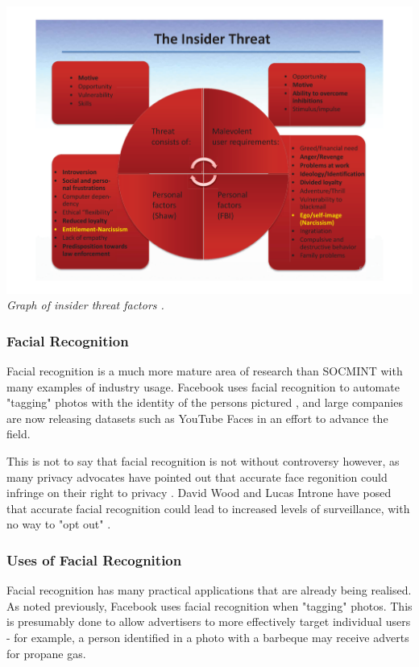 \documentclass[12pt]{article}
\begin{document}
\begin{center}
\includegraphics[width=\linewidth]{res/threat_graph.png}
\textit{Graph of insider threat factors \citep{behaviourdetection}.}
\end{center}

\subsubsection{Facial Recognition}
Facial recognition is a much more mature area of research than SOCMINT with many examples of industry usage. Facebook uses facial recognition to automate "tagging" photos with the identity of the persons pictured \citep{facebookfacialrecog}, and large companies are now releasing datasets such as YouTube Faces \citep{faceregiondescriptors} in an effort to advance the field.

This is not to say that facial recognition is not without controversy however, as many privacy advocates have pointed out that accurate face regonition could infringe on their right to privacy \citep{gchqmasssurveillance}. David Wood and Lucas Introne have posed that accurate facial recognition could lead to increased levels of surveillance, with no way to "opt out" \citep{facialrecogpolitics}\citep{facialrecogsecurityvsprivacy}.

\subsubsection{Uses of Facial Recognition}
Facial recognition has many practical applications that are already being realised. As noted previously, Facebook uses facial recognition when "tagging" photos. This is presumably done to allow advertisers to more effectively target individual users - for example, a person identified in a photo with a barbeque may receive adverts for propane gas.
\end{document}

